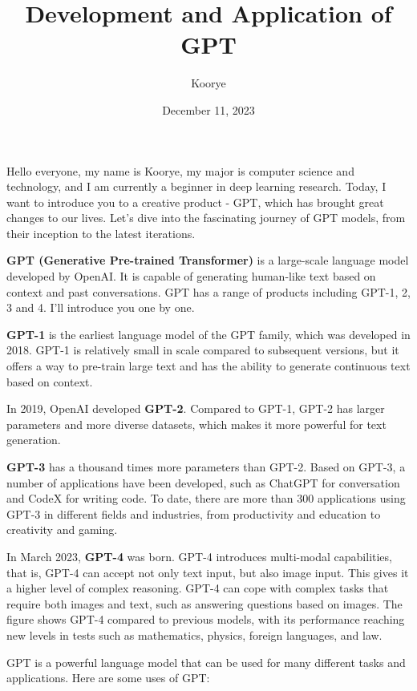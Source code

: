 \documentclass{article}
\title{Development and Application of GPT}
\date{December 11, 2023}
\author{Koorye}
\begin{document}
\maketitle
\thispagestyle{empty}

Hello everyone, my name is Koorye, my major is computer science and technology, and I am currently a beginner in deep learning research. Today, I want to introduce you to a creative product - GPT, which has brought great changes to our lives. Let's dive into the fascinating journey of GPT models, from their inception to the latest iterations. 

\textbf{GPT (Generative Pre-trained Transformer)} is a large-scale language model developed by OpenAI. It is capable of generating human-like text based on context and past conversations. GPT has a range of products including GPT-1, 2, 3 and 4. I'll introduce you one by one.

\textbf{GPT-1} is the earliest language model of the GPT family, which was developed in 2018. GPT-1 is relatively small in scale compared to subsequent versions, but it offers a way to pre-train large text and has the ability to generate continuous text based on context.

In 2019, OpenAI developed \textbf{GPT-2}. Compared to GPT-1, GPT-2 has larger parameters and more diverse datasets, which makes it more powerful for text generation.

\textbf{GPT-3} has a thousand times more parameters than GPT-2. Based on GPT-3, a number of applications have been developed, such as ChatGPT for conversation and CodeX for writing code. To date, there are more than 300 applications using GPT-3 in different fields and industries, from productivity and education to creativity and gaming.

In March 2023, \textbf{GPT-4} was born. GPT-4 introduces multi-modal capabilities, that is, GPT-4 can accept not only text input, but also image input. This gives it a higher level of complex reasoning. GPT-4 can cope with complex tasks that require both images and text, such as answering questions based on images. The figure shows GPT-4 compared to previous models, with its performance reaching new levels in tests such as mathematics, physics, foreign languages, and law.

GPT is a powerful language model that can be used for many different tasks and applications. Here are some uses of GPT:
\end{document}
